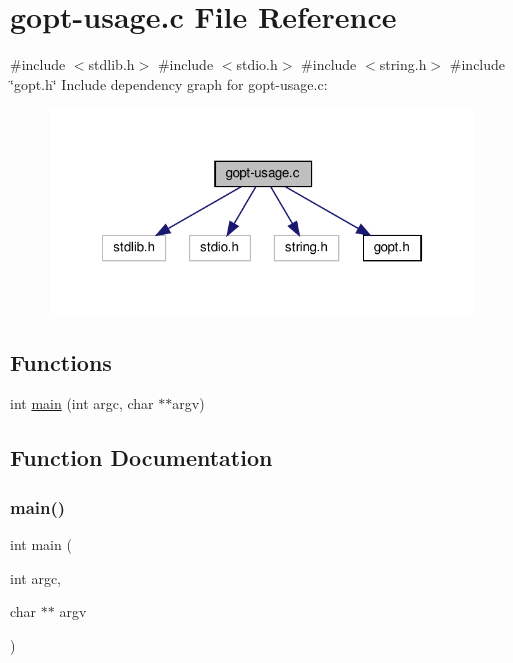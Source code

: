 \hypertarget{gopt-usage_8c}{}\section{gopt-\/usage.c File Reference}
\label{gopt-usage_8c}
{\ttfamily \#include $<$stdlib.\+h$>$}\newline
{\ttfamily \#include $<$stdio.\+h$>$}\newline
{\ttfamily \#include $<$string.\+h$>$}\newline
{\ttfamily \#include \char`\"{}gopt.\+h\char`\"{}}\newline
Include dependency graph for gopt-\/usage.c\+:\nopagebreak
\begin{figure}[H]
\begin{center}
\leavevmode
\includegraphics[width=322pt]{dd/d84/gopt-usage_8c__incl}
\end{center}
\end{figure}
\subsection*{Functions}
\begin{DoxyCompactItemize}
\item 
int \hyperlink{gopt-usage_8c_a3c04138a5bfe5d72780bb7e82a18e627}{main} (int argc, char $\ast$$\ast$argv)
\end{DoxyCompactItemize}


\subsection{Function Documentation}
\mbox{\label{gopt-usage_8c_a3c04138a5bfe5d72780bb7e82a18e627}} 
\subsubsection{\texorpdfstring{main()}{main()}}
{\footnotesize\ttfamily int main (\begin{DoxyParamCaption}\item[{int}]{argc,  }\item[{char $\ast$$\ast$}]{argv }\end{DoxyParamCaption})}

